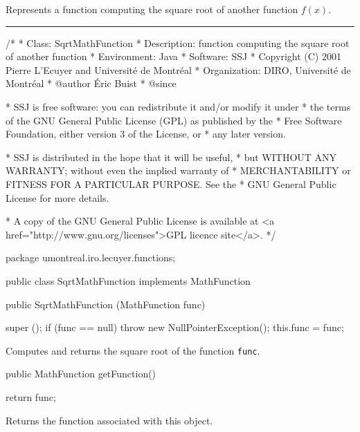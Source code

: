 
Represents a function computing
the square root of another function
$f(x)$.

\bigskip\hrule

\begin{code}
\begin{hide}
/*
 * Class:        SqrtMathFunction
 * Description:  function computing the square root of another function
 * Environment:  Java
 * Software:     SSJ 
 * Copyright (C) 2001  Pierre L'Ecuyer and Université de Montréal
 * Organization: DIRO, Université de Montréal
 * @author       Éric Buist
 * @since

 * SSJ is free software: you can redistribute it and/or modify it under
 * the terms of the GNU General Public License (GPL) as published by the
 * Free Software Foundation, either version 3 of the License, or
 * any later version.

 * SSJ is distributed in the hope that it will be useful,
 * but WITHOUT ANY WARRANTY; without even the implied warranty of
 * MERCHANTABILITY or FITNESS FOR A PARTICULAR PURPOSE.  See the
 * GNU General Public License for more details.

 * A copy of the GNU General Public License is available at
   <a href="http://www.gnu.org/licenses">GPL licence site</a>.
 */
\end{hide}
package umontreal.iro.lecuyer.functions;\begin{hide}
\end{hide}

public class SqrtMathFunction implements MathFunction\begin{hide} {
   private MathFunction func;
\end{hide}

   public SqrtMathFunction (MathFunction func)\begin{hide} {
      super ();
      if (func == null)
         throw new NullPointerException();
      this.func = func;
   }\end{hide}
\end{code}
\begin{tabb}   Computes and returns the square
 root of the function \texttt{func}.
\end{tabb}
\begin{htmlonly}
\end{htmlonly}
\begin{code}

   public MathFunction getFunction()\begin{hide} {
      return func;
   }\end{hide}
\end{code}
\begin{tabb}   Returns the function associated with
 this object.
\end{tabb}
\begin{htmlonly}
\end{htmlonly}
\begin{code}\begin{hide}

   public double evaluate (double x) {
      return Math.sqrt (func.evaluate (x));
   }
}\end{hide}
\end{code}
